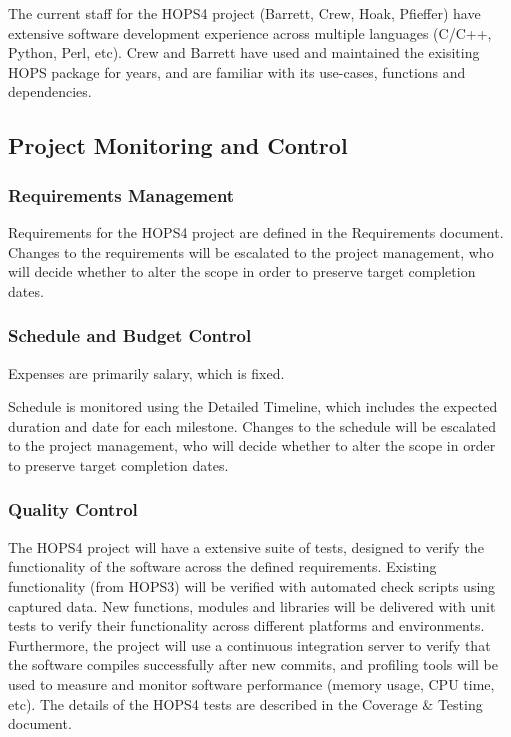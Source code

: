 The current staff for the HOPS4 project (Barrett, Crew, Hoak, Pfieffer) have extensive software development experience across multiple languages (C/C++, Python, Perl, etc).  Crew and Barrett have used and maintained the exisiting HOPS package for years, and are familiar with its use-cases, functions and dependencies.

\subsection{Project Monitoring and Control}

\subsubsection{Requirements Management}

Requirements for the HOPS4 project are defined in the Requirements document. Changes to the requirements will be escalated to the project management, who will decide whether to alter the scope in order to preserve target completion dates.


\subsubsection{Schedule and Budget Control}

Expenses are primarily salary, which is fixed.

Schedule is monitored using the Detailed Timeline, which includes the expected duration and date for each milestone. Changes to the schedule will be escalated to the project management, who will decide whether to alter the scope in order to preserve target completion dates.

\subsubsection{Quality Control}

The HOPS4 project will have a extensive suite of tests, designed to verify the functionality of the software across the defined requirements. Existing functionality (from HOPS3) will be verified with automated check scripts using captured data.  New functions, modules and libraries will be delivered with unit tests to verify their functionality across different platforms and environments.  Furthermore, the project will use a continuous integration server to verify that the software compiles successfully after new commits, and profiling tools will be used to measure and monitor software performance (memory usage, CPU time, etc).  The details of the HOPS4 tests are described in the Coverage \& Testing document.

